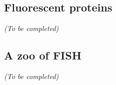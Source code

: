 \subsection{Fluorescent proteins}
\label{subsec:intro_fluorescence}

\begin{center}
	\textit{(To be completed)}
\end{center}

\subsection{A zoo of FISH}
\label{subsec:intro_fish}

\begin{center}
	\textit{(To be completed)}
\end{center}







